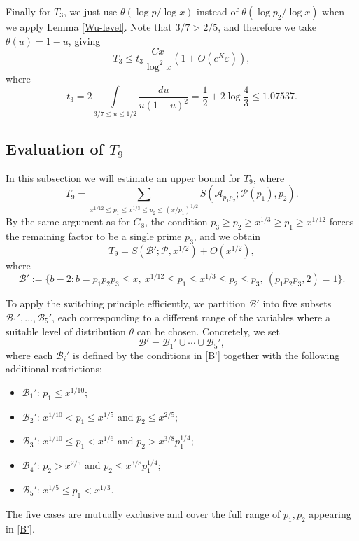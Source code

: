 \documentclass[12pt, a4paper]{amsart}
\def\leq{\leqslant}
\def\le{\leqslant}
\def\ge{\geqslant}
\theoremstyle{plain}
\theoremstyle{remark}
\numberwithin{equation}{section}
\begin{document}
Finally for $T_3$, we just use $\theta(\log p/\log x)$ instead of $\theta(\log p_2/\log x)$ 
when we apply Lemma \ref{Wu-level}. Note that $3/7>2/5$, and therefore we take $\theta(u)=1-u$, giving 
\begin{equation}\label{T3}
T_{3} \le t_3\dfrac{Cx}{\log^2 x} (1+O(e^K\varepsilon)),
\end{equation}
where 
\begin{equation}\label{t3}
t_{3}=
2\int\limits_{3/7 \le u \le 1/2} \frac{du}{u(1 - u)^2}
=\dfrac{1}{2}+2\log \dfrac{4}{3}
\le 1.07537.
\end{equation}

\subsection{Evaluation of $T_9$}
In this subsection we will estimate an upper bound for $T_9$, where  
\begin{equation}
T_9 = \sum_{x^{1/12} \leq p_1 \le x^{1/3} \leq p_2 \le (x/p_1)^{1/2} } S(\mathscr{A}_{p_1 p_2}; \mathscr{P}(p_1), p_2).
\end{equation}
By the same argument as for $G_8$, the condition $p_3 \ge p_2\ge x^{1/3}\ge p_1\ge x^{1/12}$ 
forces the remaining factor to be a single prime $p_3$, and we obtain  
\begin{equation}
T_{9} = S(\mathscr{B}'; \mathscr{P}, x^{1/2}) + O(x^{1/2}),
\end{equation}
where
\begin{equation}\label{B'}
\mathscr{B}' := \{ b - 2 : b = p_1p_2p_3 \leq x,\ x^{1/12} \leq p_1 \leq x^{1/3} \leq p_2 \leq p_3,\ (p_1p_2p_3,2)=1 \}.
\end{equation}

To apply the switching principle efficiently, we partition $\mathscr{B}'$ into five subsets
$\mathscr{B}_1',\dots,\mathscr{B}_5'$, each corresponding to a different range of the variables
where a suitable level of distribution $\theta$ can be chosen. Concretely, we set
\[
\mathscr{B}' = \mathscr{B}_1' \cup \cdots \cup \mathscr{B}_5',
\]
where each $\mathscr{B}_i'$ is defined by the conditions in \eqref{B'} together with the
following additional restrictions:
\begin{itemize}
	\item $\mathscr{B}_1'$: $p_1 \le x^{1/10}$;
	\item $\mathscr{B}_2'$: $x^{1/10} < p_1 \le x^{1/5}$ and $p_2 \le x^{2/5}$;
	\item $\mathscr{B}_3'$: $x^{1/10} \le p_1 < x^{1/6}$ and $p_2> x^{3/8}p_1^{1/4}$;
	\item $\mathscr{B}_4'$: $p_2 > x^{2/5}$ and $p_2 \le x^{3/8}p_1^{1/4}$;
	\item $\mathscr{B}_5'$: $x^{1/5} \le p_1 < x^{1/3}$.
\end{itemize}
The five cases are mutually exclusive and cover the full range of $p_1,p_2$ appearing
in \eqref{B'}.
\end{document}
